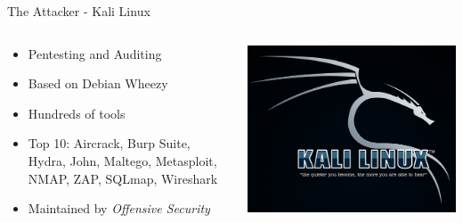\documentclass{beamer}
\begin{document}
	\begin{frame}{The Attacker - Kali Linux}
            		\begin{columns}
             		\begin{column}{0.5\textwidth}
                			\begin{itemize}
                    			\item Pentesting and Auditing
                    			\item Based on Debian Wheezy
                    			\item Hundreds of tools
					\item Top 10: Aircrack, Burp Suite, Hydra, John, Maltego, Metasploit, NMAP, ZAP, SQLmap, Wireshark
					\item Maintained by {\em Offensive Security}
                			\end{itemize}
              		\end{column}
            
            		\begin{column}{0.5\textwidth}
				\begin{center}
                 		\includegraphics[width=\textwidth]{kali-bg.png}
				\end{center}
              		\end{column}
            		\end{columns}				
	\end{frame}
	
\end{document}
